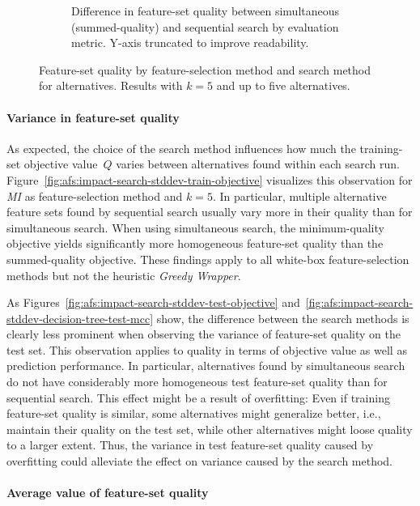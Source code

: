 \documentclass{article}
\theoremstyle{definition}
\begin{document}
\begin{figure}[htb]
\begin{subfigure}[t]{0.48\textwidth}
		\caption{
			Difference in feature-set quality between simultaneous (summed-quality) and sequential search by evaluation metric.
			Y-axis truncated to improve readability.
		}
		\label{fig:afs:impact-search-fs-method-metric-diff}
	\end{subfigure}
	\caption{
		Feature-set quality by feature-selection method and search method for alternatives.
		Results with $k=5$ and up to five alternatives.
	}
	\label{fig:afs:impact-search-fs-method-quality}
\end{figure}

\paragraph{Variance in feature-set quality}

As expected, the choice of the search method influences how much the training-set objective value~$Q$ varies between alternatives found within each search run.
Figure~\ref{fig:afs:impact-search-stddev-train-objective} visualizes this observation for \emph{MI} as feature-selection method and $k=5$.
In particular, multiple alternative feature sets found by sequential search usually vary more in their quality than for simultaneous search.
When using simultaneous search, the minimum-quality objective yields significantly more homogeneous feature-set quality than the summed-quality objective.
These findings apply to all white-box feature-selection methods but not the heuristic \emph{Greedy Wrapper}.

As Figures~\ref{fig:afs:impact-search-stddev-test-objective} and~\ref{fig:afs:impact-search-stddev-decision-tree-test-mcc} show, the difference between the search methods is clearly less prominent when observing the variance of feature-set quality on the test set.
This observation applies to quality in terms of objective value as well as prediction performance.
In particular, alternatives found by simultaneous search do not have considerably more homogeneous test feature-set quality than for sequential search.
This effect might be a result of overfitting:
Even if training feature-set quality is similar, some alternatives might generalize better, i.e., maintain their quality on the test set, while other alternatives might loose quality to a larger extent.
Thus, the variance in test feature-set quality caused by overfitting could alleviate the effect on variance caused by the search method.

\paragraph{Average value of feature-set quality}
\end{document}
